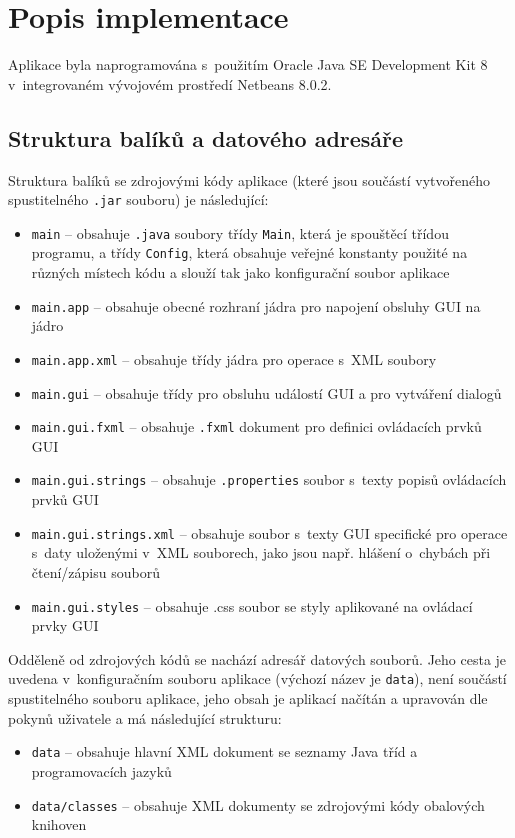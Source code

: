 \documentclass[czech,BP]{thesiskiv}
\begin{document}
\section{Popis implementace}
Aplikace byla naprogramována s~použitím Oracle Java SE Development Kit 8 v~integrovaném vývojovém prostředí Netbeans 8.0.2.

\subsection{Struktura balíků a datového adresáře}
Struktura balíků se zdrojovými kódy aplikace (které jsou součástí vytvořeného spustitelného \texttt{.jar} souboru) je následující:
\begin{itemize}
\item{\texttt{main} -- obsahuje \texttt{.java} soubory třídy \texttt{Main}, která je spouštěcí třídou programu, a třídy \texttt{Config}, která obsahuje veřejné konstanty použité na různých místech kódu a slouží tak jako konfigurační soubor aplikace}
\item{\texttt{main.app} -- obsahuje obecné rozhraní jádra pro napojení obsluhy GUI na jádro}
\item{\texttt{main.app.xml} -- obsahuje třídy jádra pro operace s~XML soubory}
\item{\texttt{main.gui} -- obsahuje třídy pro obsluhu událostí GUI a pro vytváření dialogů}
\item{\texttt{main.gui.fxml} -- obsahuje \texttt{.fxml} dokument pro definici ovládacích prvků GUI}
\item{\texttt{main.gui.strings} --  obsahuje \texttt{.properties} soubor s~texty popisů ovládacích prvků GUI}
\item{\texttt{main.gui.strings.xml} -- obsahuje soubor s~texty GUI specifické pro operace s~daty uloženými v~XML souborech, jako jsou např. hlášení o~chybách při čtení/zápisu souborů}
\item{\texttt{main.gui.styles} -- obsahuje {.css} soubor se styly aplikované na ovládací prvky GUI}
\end{itemize}

\noindent
Odděleně od zdrojových kódů se nachází adresář datových souborů. Jeho cesta je uvedena v~konfiguračním souboru aplikace (výchozí název je \texttt{data}), není součástí spustitelného souboru aplikace, jeho obsah je aplikací načítán a upravován dle pokynů uživatele a má následující strukturu:
\begin{itemize}
\item{\texttt{data} -- obsahuje hlavní XML dokument se seznamy Java tříd a programovacích jazyků}
\item{\texttt{data/classes} -- obsahuje XML dokumenty se zdrojovými kódy obalových knihoven}
\end{itemize}
\end{document}
